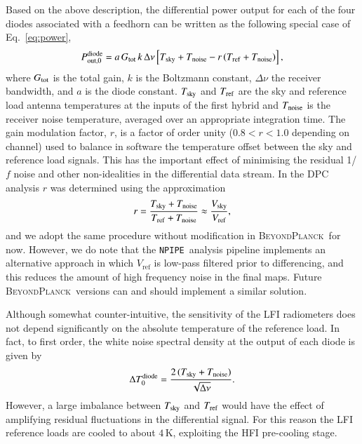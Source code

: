 \documentclass[onecolumn]{aa}
\newcommand{\BP}{\textsc{BeyondPlanck}}
\newcommand{\npipe}[0]{\texttt{NPIPE}}
\begin{document}
Based on the above description, the differential power output for each
of the four diodes associated with a feedhorn can be written as the following
special case of Eq.~\eqref{eq:power},
\begin{equation}
  P_{{\rm out},0}^{\rm diode} = a\, G_{\rm tot}\,k\,\Delta\nu \left[ T_{\rm sky} + T_{\rm noise} - r\left( T_{\rm ref} + T_{\rm noise}\right) \right],
  \label{eq_p0}
\end{equation}
where $G_{\rm tot}$ is the total gain, $k$ is the Boltzmann constant,
$\Delta\nu$ the receiver bandwidth, and $a$ is the diode constant.
$T_{\rm sky}$ and $T_{\rm ref}$ are the sky and reference load antenna
temperatures at the inputs of the first hybrid and $T_{\rm noise}$ is
the receiver noise temperature, averaged over an appropriate
integration time. The gain modulation factor, $r$, is a factor of order
unity ($0.8 < r < 1.0$ depending on channel) used to balance in
software the temperature offset between the sky and reference load
signals. This has the important effect of minimising the residual
1/$f$ noise and other non-idealities in the differential data stream.
In the DPC analysis \citep{planck2016-l02} $r$ was determined using
the approximation
\begin{equation}
  r = \frac{T_{\rm sky} + T_{\rm noise}}{T_{\rm ref} + T_{\rm noise}} \approx \frac{V_{\rm sky}}{V_{\rm ref}},
  \label{eq_r}
\end{equation}
and we adopt the same procedure without modification in \BP\ for
now. However, we do note that the \npipe\ analysis pipeline implements
an alternative approach in which $V_{\mathrm{ref}}$ is low-pass
filtered prior to differencing, and this reduces the amount of high
frequency noise in the final maps. Future \BP\ versions can and should
implement a similar solution.

Although somewhat counter-intuitive, the sensitivity of the LFI
radiometers does not depend significantly on the absolute temperature
of the reference load.  In fact, to first order, the white noise
spectral density at the output of each diode is given by
\begin{equation}
  \Delta T_0^{\rm diode} = \frac{2\,(T_{\rm sky}+T_{\rm noise})}{\sqrt{\Delta\nu}}.
  \label{eq_deltat_diode_ideal}
\end{equation}
However, a large imbalance between $T_{\rm sky}$ and $T_{\rm ref}$
would have the effect of amplifying residual fluctuations in the
differential signal. For this reason the LFI reference loads are
cooled to about $4$\,K, exploiting the HFI pre-cooling stage.
\end{document}
